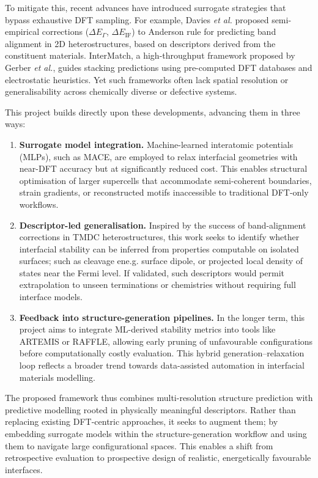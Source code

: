 To mitigate this, recent advances have introduced surrogate strategies that bypass exhaustive DFT sampling. For
example, Davies \textit{et al.} proposed semi-empirical corrections (\(\Delta E_\Gamma\), \(\Delta E_{\mathrm{IF}}\)) to Anderson\rqss
rule for predicting band alignment in 2D heterostructures, based on descriptors derived from the constituent materials.
InterMatch, a high-throughput framework proposed by Gerber \textit{et al.}, guides stacking predictions using
pre-computed DFT databases and electrostatic heuristics. Yet such frameworks often lack spatial resolution or
generalisability across chemically diverse or defective systems.

This project builds directly upon these developments, advancing them in three ways:

\begin{enumerate}
    \item \textbf{Surrogate model integration.} Machine-learned interatomic potentials (MLPs), such as MACE, are
    employed to relax interfacial geometries with near-DFT accuracy but at significantly reduced cost. This enables
    structural optimisation of larger supercells that accommodate semi-coherent boundaries, strain gradients, or
    reconstructed motifs inaccessible to traditional DFT-only workflows.

    \item \textbf{Descriptor-led generalisation.} Inspired by the success of band-alignment corrections in TMDC
    heterostructures, this work seeks to identify whether interfacial stability can be inferred from properties
    computable on isolated surfaces; such as cleavage ene.g. surface dipole, or projected local density of states near
    the Fermi level. If validated, such descriptors would permit extrapolation to unseen terminations or chemistries
    without requiring full interface models.

    \item \textbf{Feedback into structure-generation pipelines.} In the longer term, this project aims to integrate
    ML-derived stability metrics into tools like \textsc{ARTEMIS} or \textsc{RAFFLE}, allowing early pruning of
    unfavourable configurations before computationally costly evaluation. This hybrid generation--relaxation loop
    reflects a broader trend towards data-assisted automation in interfacial materials modelling.
\end{enumerate}

The proposed framework thus combines multi-resolution structure prediction with predictive modelling rooted in
physically meaningful descriptors. Rather than replacing existing DFT-centric approaches, it seeks to augment them; by
embedding surrogate models within the structure-generation workflow and using them to navigate large configurational
spaces. This enables a shift from retrospective evaluation to prospective design of realistic, energetically favourable
interfaces.

